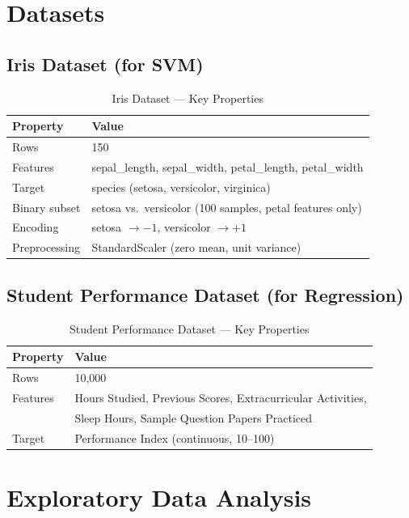 \documentclass[12pt,a4paper]{article}
\begin{document}
\section{Datasets}

\subsection{Iris Dataset (for SVM)}
\begin{table}[H]
\centering
\caption{Iris Dataset — Key Properties}
\begin{tabular}{ll}
\toprule
\textbf{Property} & \textbf{Value} \\ \midrule
Rows & 150 \\
Features & sepal\_length, sepal\_width, petal\_length, petal\_width \\
Target & species (setosa, versicolor, virginica) \\
Binary subset & setosa vs.\ versicolor (100 samples, petal features only) \\
Encoding & setosa $\to -1$, versicolor $\to +1$ \\
Preprocessing & StandardScaler (zero mean, unit variance) \\
\bottomrule
\end{tabular}
\end{table}

\subsection{Student Performance Dataset (for Regression)}
\begin{table}[H]
\centering
\caption{Student Performance Dataset — Key Properties}
\begin{tabular}{ll}
\toprule
\textbf{Property} & \textbf{Value} \\ \midrule
Rows & 10{,}000 \\
Features & Hours Studied, Previous Scores, Extracurricular Activities, \\
         & Sleep Hours, Sample Question Papers Practiced \\
Target & Performance Index (continuous, 10--100) \\
\bottomrule
\end{tabular}
\end{table}

\section{Exploratory Data Analysis}
\end{document}
